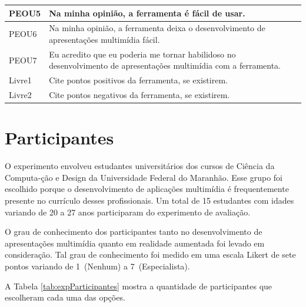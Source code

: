 \documentclass[../main.tex]{subfiles}
\begin{document}
\begin{table}[htpb]
\begin{tabularx}{.95\linewidth}{m{1.3cm} X}
PEOU5 & Na minha opinião, a ferramenta é fácil de usar.
\\\midrule
PEOU6 & Na minha opinião, a ferramenta deixa o desenvolvimento de apresentações multimídia fácil.
\\\midrule
PEOU7 & Eu acredito que eu poderia me tornar habilidoso no desenvolvimento de apresentações multimídia com a ferramenta.
\\\midrule
Livre1 & Cite pontos positivos da ferramenta, se existirem.
\\\midrule
Livre2 & Cite pontos negativos da ferramenta, se existirem.
\\\bottomrule
\end{tabularx}
\end{table}

\section{Participantes}
\label{sec:participantes}

O experimento envolveu estudantes universitários dos cursos de Ciência da Computa-ção e Design da Universidade Federal do Maranhão. Esse grupo foi escolhido porque o desenvolvimento de aplicações multimídia é frequentemente presente no currículo desses profissionais. Um total de 15 estudantes com idades variando de 20 a 27 anos participaram do experimento de avaliação.

O grau de conhecimento dos participantes tanto no desenvolvimento de apresentações multimídia quanto em realidade aumentada foi levado em consideração. Tal grau de conhecimento foi medido em uma escala Likert de sete pontos variando de 1~(Nenhum) a 7~(Especialista).

A Tabela \ref{tab:expParticipantes} mostra a quantidade de participantes que escolheram cada uma das opções.
\end{document}
